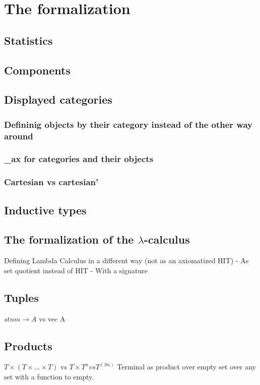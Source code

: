 \chapter{The formalization}

\section{Statistics}

\section{Components}

\section{Displayed categories}

\subsection{Defininig objects by their category instead of the other way around}

\subsection{\_ax for categories and their objects}

\subsection{Cartesian vs cartesian'}

\section{Inductive types}

\section{The formalization of the \texorpdfstring{$ \lambda $}{lambda}-calculus}
Defining Lambda Calculus in a different way (not as an axiomatized HIT)
  - As set quotient instead of HIT
  - With a signature

\section{Tuples}
$ stn m \to A $ vs vec A

\section{Products}
$ T \times (T \times \dots \times T) $ vs $ T \times T^n vs T^(S n) $
Terminal as product over empty set
over any set with a function to empty.

